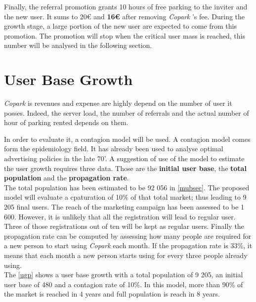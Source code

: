 \documentclass[12pt,a4paper,oneside]{book}
\newcommand{\bp}{\textit{Copark }}
\begin{document}
Finally, the referral promotion grants 10 hours of free parking to the inviter and the new user. It sums to 20\euro{} and \textbf{16\euro{}} after removing \bp's fee. During the growth stage, a large portion of the new user are expected to come from this promotion. The promotion will stop when the critical user mass is reached, this number will be analysed in the following section.

\section{User Base Growth}
\bp is revenues and expense are highly depend on the number of user it posses. Indeed, the server load, the number of referrals and the actual number of hour of parking rented depends on them.

In order to evaluate it, a contagion model will be used. A contagion model comes form the epidemiology field. It has already been used to analyse optimal advertising policies in the late 70'.\cite{sethi1979optimal} A suggestion of use of the model to estimate the user growth requires three data. Those are the \textbf{initial user base}, the \textbf{total population} and the \textbf{propagation rate}.\cite{cmep}\\

The total population has been estimated to be 92 056 in \autoref{mubsec}. The proposed model will evaluate a cpaturation of 10\% of that total market; thus leading to 9 205 final users. The reach of the marketing campaign has been assessed to be 1 600. However, it is unlikely that all the registration will lead to regular user. Three of those registrations out of ten will be kept as regular users. Finally the propagation rate can be computed by assessing how many people are required for a new person to start using \bp each month. If the propagation rate is 33\%, it means that each month a new person starts using for every three people already using.\\

The \autoref{ugp} shows a user base growth with a total population of 9 205, an initial user base of 480 and a contagion rate of 10\%. In this model, more than 90\% of the market is reached in 4 years and full population is reach in 8 years.\\
\end{document}
